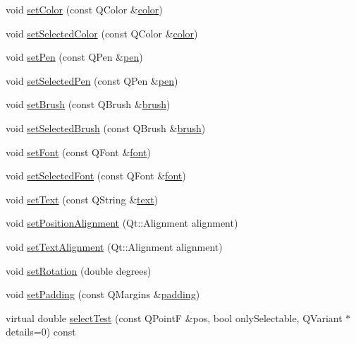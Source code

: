 \begin{DoxyCompactItemize}
\item 
void \hyperlink{class_q_c_p_item_text_aa51efc0841fe52da9eaf8aff6fc8a8b2}{set\+Color} (const Q\+Color \&\hyperlink{class_q_c_p_item_text_ac9cb0a8a27f64d1b40855910ea9ebd03}{color})
\item 
void \hyperlink{class_q_c_p_item_text_ae7ba0bdb75c897b028388e45bfd435fa}{set\+Selected\+Color} (const Q\+Color \&\hyperlink{class_q_c_p_item_text_ac9cb0a8a27f64d1b40855910ea9ebd03}{color})
\item 
void \hyperlink{class_q_c_p_item_text_a9b9ec6eea0eb0603977ff84d4c78d0a3}{set\+Pen} (const Q\+Pen \&\hyperlink{class_q_c_p_item_text_a552bd02f46dbcb4b4812559036893352}{pen})
\item 
void \hyperlink{class_q_c_p_item_text_a291febe586f0da3f1c392e77bef4aa20}{set\+Selected\+Pen} (const Q\+Pen \&\hyperlink{class_q_c_p_item_text_a552bd02f46dbcb4b4812559036893352}{pen})
\item 
void \hyperlink{class_q_c_p_item_text_a1c7e131516df2ed8d941ef31240ded8e}{set\+Brush} (const Q\+Brush \&\hyperlink{class_q_c_p_item_text_a38b981dfacb703efa8e27346eebcb5a2}{brush})
\item 
void \hyperlink{class_q_c_p_item_text_a6b8377eeb2af75eb9528422671ac16cb}{set\+Selected\+Brush} (const Q\+Brush \&\hyperlink{class_q_c_p_item_text_a38b981dfacb703efa8e27346eebcb5a2}{brush})
\item 
void \hyperlink{class_q_c_p_item_text_a94ad60ebe04f5c07c35e7c2029e96b1f}{set\+Font} (const Q\+Font \&\hyperlink{class_q_c_p_item_text_ad34943fd68a9b1451d3e3234d072e418}{font})
\item 
void \hyperlink{class_q_c_p_item_text_a0be2841772f83663c4db307928b82816}{set\+Selected\+Font} (const Q\+Font \&\hyperlink{class_q_c_p_item_text_ad34943fd68a9b1451d3e3234d072e418}{font})
\item 
void \hyperlink{class_q_c_p_item_text_a3dacdda0ac88f99a05b333b977c48747}{set\+Text} (const Q\+String \&\hyperlink{class_q_c_p_item_text_a9547f7832010486abed0837e75db5330}{text})
\item 
void \hyperlink{class_q_c_p_item_text_a781cdf8c640fc6a055dcff1e675c8c7a}{set\+Position\+Alignment} (Qt\+::\+Alignment alignment)
\item 
void \hyperlink{class_q_c_p_item_text_ab5bc0684c4d1bed81949a11b34dba478}{set\+Text\+Alignment} (Qt\+::\+Alignment alignment)
\item 
void \hyperlink{class_q_c_p_item_text_a4bcc10cd97952c3f749d75824b5077f0}{set\+Rotation} (double degrees)
\item 
void \hyperlink{class_q_c_p_item_text_aeea8a3e01f135f9dd0bb08f51db66310}{set\+Padding} (const Q\+Margins \&\hyperlink{class_q_c_p_item_text_a00e0fa03822ff384bf4921c1c90322ff}{padding})
\item 
virtual double \hyperlink{class_q_c_p_item_text_a285b95bb6634c2e4f7768abb7a8bc69c}{select\+Test} (const Q\+Point\+F \&pos, bool only\+Selectable, Q\+Variant $\ast$details=0) const 
\end{DoxyCompactItemize}
